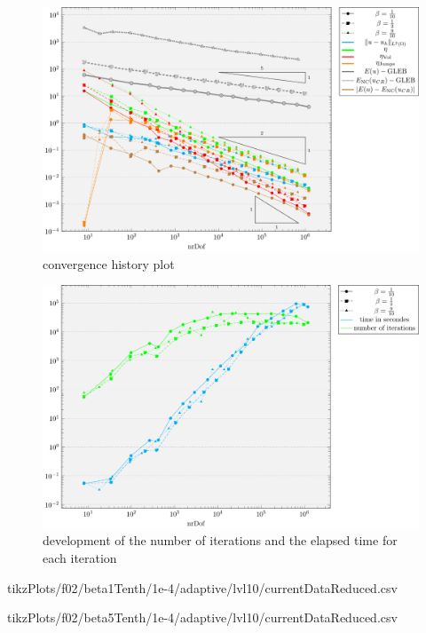 \documentclass[draft=false,twoside,12pt]{scrreprt}
\begin{document}
\vspace{-\parskip}
\begin{figure}[H]
	\centering
	\includegraphics[width=16.5cm]{tikzPlots/f02/convergence.pdf}
  \caption{convergence history plot}
\end{figure}

\vspace{-\parskip}
\begin{figure}[H]
	\centering
	\includegraphics[width=16cm]{tikzPlots/f02/misc.pdf}
  \caption{development of the number of iterations and the elapsed time for 
  each iteration}
\end{figure}

  {tikzPlots/f02/beta1Tenth/1e-4/adaptive/lvl10/currentDataReduced.csv}

  {tikzPlots/f02/beta5Tenth/1e-4/adaptive/lvl10/currentDataReduced.csv}
\end{document}
